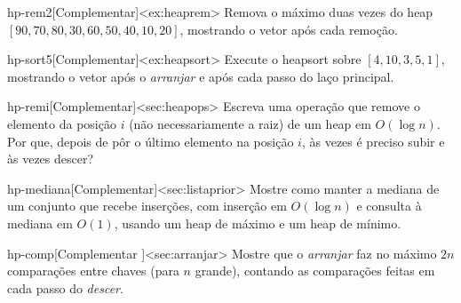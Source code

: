 \begin{exercicio}{hp-rem2}[Complementar]<ex:heaprem>
Remova o máximo duas vezes do heap $[90,70,80,30,60,50,40,10,20]$, mostrando o vetor após cada remoção.
\end{exercicio}
\begin{exercicio}{hp-sort5}[Complementar]<ex:heapsort>
Execute o heapsort sobre $[4,10,3,5,1]$, mostrando o vetor após o \emph{arranjar} e após cada passo do laço principal.
\end{exercicio}
\begin{exercicio}{hp-remi}[Complementar]<sec:heapops>
Escreva uma operação que remove o elemento da posição $i$ (não necessariamente a raiz) de um heap em $O(\log n)$. Por que, depois de pôr o último elemento na posição $i$, às vezes é preciso subir e às vezes descer?
\end{exercicio}
\begin{exercicio}{hp-mediana}[Complementar]<sec:listaprior>
Mostre como manter a mediana de um conjunto que recebe inserções, com inserção em $O(\log n)$ e consulta à mediana em $O(1)$, usando um heap de máximo e um heap de mínimo.
\end{exercicio}
\begin{exercicio}{hp-comp}[Complementar \estrela]<sec:arranjar>
Mostre que o \emph{arranjar} faz no máximo $2n$ comparações entre chaves (para $n$ grande), contando as comparações feitas em cada passo do \emph{descer}.
\end{exercicio}
